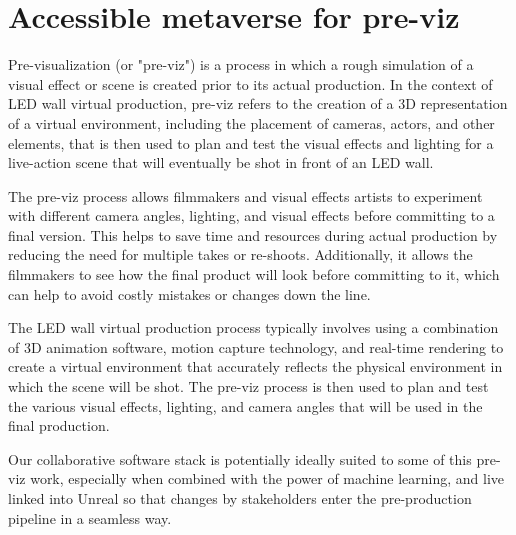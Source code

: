 \section{Accessible metaverse for pre-viz}
Pre-visualization (or "pre-viz") is a process in which a rough simulation of a visual effect or scene is created prior to its actual production. In the context of LED wall virtual production, pre-viz refers to the creation of a 3D representation of a virtual environment, including the placement of cameras, actors, and other elements, that is then used to plan and test the visual effects and lighting for a live-action scene that will eventually be shot in front of an LED wall.\par
The pre-viz process allows filmmakers and visual effects artists to experiment with different camera angles, lighting, and visual effects before committing to a final version. This helps to save time and resources during actual production by reducing the need for multiple takes or re-shoots. Additionally, it allows the filmmakers to see how the final product will look before committing to it, which can help to avoid costly mistakes or changes down the line.\par
The LED wall virtual production process typically involves using a combination of 3D animation software, motion capture technology, and real-time rendering to create a virtual environment that accurately reflects the physical environment in which the scene will be shot. The pre-viz process is then used to plan and test the various visual effects, lighting, and camera angles that will be used in the final production.\par 
Our collaborative software stack is potentially ideally suited to some of this pre-viz work, especially when combined with the power of machine learning, and live linked into Unreal so that changes by stakeholders enter the pre-production pipeline in a seamless way.
